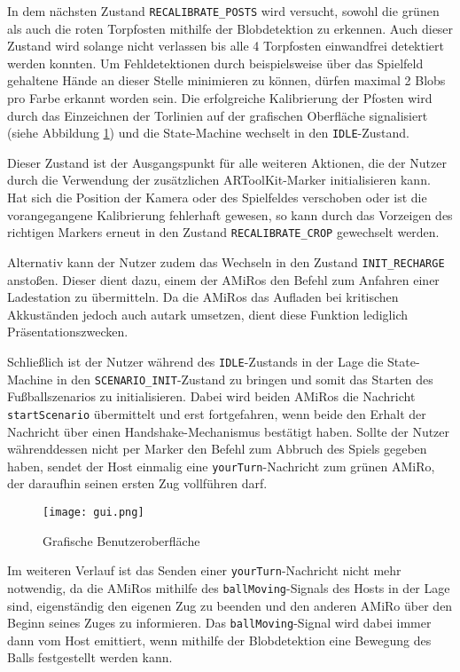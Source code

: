 In dem nächsten Zustand \texttt{RECALIBRATE\_POSTS} wird versucht, sowohl die grünen als auch die roten Torpfosten mithilfe der Blobdetektion zu erkennen. Auch dieser Zustand wird solange nicht verlassen bis alle 4 Torpfosten einwandfrei detektiert werden konnten. Um Fehldetektionen durch beispielsweise über das Spielfeld gehaltene Hände an dieser Stelle minimieren zu können, dürfen maximal 2 Blobs pro Farbe erkannt worden sein. Die erfolgreiche Kalibrierung der Pfosten wird durch das Einzeichnen der Torlinien auf der grafischen Oberfläche signalisiert (siehe Abbildung \ref{fig:gui}) und die State-Machine wechselt in den \texttt{IDLE}-Zustand.

Dieser Zustand ist der Ausgangspunkt für alle weiteren Aktionen, die der Nutzer durch die Verwendung der zusätzlichen ARToolKit-Marker initialisieren kann. Hat sich die Position der Kamera oder des Spielfeldes verschoben oder ist die vorangegangene Kalibrierung fehlerhaft gewesen, so kann durch das Vorzeigen des richtigen Markers erneut in den Zustand \texttt{RECALIBRATE\_CROP} gewechselt werden.

Alternativ kann der Nutzer zudem das Wechseln in den Zustand \texttt{INIT\_RECHARGE} anstoßen. Dieser dient dazu, einem der AMiRos den Befehl zum Anfahren einer Ladestation zu übermitteln. Da die AMiRos das Aufladen bei kritischen Akkuständen jedoch auch autark umsetzen, dient diese Funktion lediglich Präsentationszwecken.

Schließlich ist der Nutzer während des \texttt{IDLE}-Zustands in der Lage die State-Machine in den \texttt{SCENARIO\_INIT}-Zustand zu bringen und somit das Starten des Fußballszenarios zu initialisieren. Dabei wird beiden AMiRos die Nachricht \texttt{startScenario} übermittelt und erst fortgefahren, wenn beide den Erhalt der Nachricht über einen Handshake-Mechanismus bestätigt haben. Sollte der Nutzer währenddessen nicht per Marker den Befehl zum Abbruch des Spiels gegeben haben, sendet der Host einmalig eine \texttt{yourTurn}-Nachricht zum grünen AMiRo, der daraufhin seinen ersten Zug vollführen darf.

\begin{figure}[t]
	\begin{center}
		\texttt{[image: gui.png]} 	
		\caption{Grafische Benutzeroberfläche}
		\label{fig:gui}
	\end{center}
\end{figure}

Im weiteren Verlauf ist das Senden einer \texttt{yourTurn}-Nachricht nicht mehr notwendig, da die AMiRos mithilfe des \texttt{ballMoving}-Signals des Hosts in der Lage sind, eigenständig den eigenen Zug zu beenden und den anderen AMiRo über den Beginn seines Zuges zu informieren. Das \texttt{ballMoving}-Signal wird dabei immer dann vom Host emittiert, wenn mithilfe der Blobdetektion eine Bewegung des Balls festgestellt werden kann.

